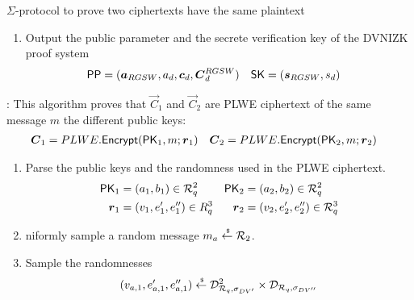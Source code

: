 \begin{section}{$\Sigma$-protocol to prove two ciphertexts have the same plaintext}
\begin{description}
\begin{enumerate}
\begin{enumerate}
        \item Sample polynomials $v,e' \sample \mathcal{D}_{R_q, \sigma_{BV}}$ and $e'' \sample  \mathcal{D}_{R_q, \sigma_{BV}'}$.
        \item Compute the following ciphertexts
          \begin{align*}
            \mat{C}_d^{RGSW} &= \vec{a}_{RGSW} \cdot \mat{R}_{RGSW} + \mat{E}_{RSGW} +  d \cdot \mat{G} &
            \vec{c}_d &= \begin{bmatrix} b_d v + 2e'' + \mu \\ -a_d v + 2e' \end{bmatrix}
          \end{align*}
        \end{enumerate}
        \item Output the public parameter and the secrete verification key of the DVNIZK proof system
        \begin{align*}
          \PPP &= (\vec{a}_{RGSW}, a_d, \vec{c}_d, \vec{C}_d^{RGSW}) & \SK &= (\vec{s}_{RGSW}, s_d)
        \end{align*}
      \end{enumerate}
      \item [$\Prove(\PPP, \vec{C}_1, \vec{C_2}, \vec{r}_1, \vec{r}_2, m, \PK_1, \PK_2)$]:
      This algorithm proves that $\vec{C}_1$ and $\vec{C}_2$ are PLWE ciphertext of the same message $m$
      \wrt the different public keys:
      \begin{align*}
        \vec{C}_1 &= PLWE.\Enc(\PK_1, m; \vec{r}_1) &  \vec{C}_2 &= PLWE.\Enc(\PK_2, m; \vec{r}_2)
      \end{align*}
      \begin{enumerate}
        \item Parse the public keys and the randomness used in the PLWE ciphertext.
        \begin{align*}
          \PK_1 &= (a_1, b_1) \in \R_q^2 & \PK_2 &= (a_2, b_2) \in \R_q^2 \\
          \vec{r}_1 &= (v_1, e_1', e_1'') \in R_q^3 & \vec{r}_2 &= (v_2, e_2', e_2'') \in \R_q^3
        \end{align*}
        \item niformly sample a random message $m_a \stackrel{{\scriptscriptstyle \mkern4mu \$}}{\gets} {\mathcal{R}}_2$.
        \item Sample the randomnesses
        \begin{align*}
          (v_{a,1}, e_{a,1}', e_{a,1}'') &\sample \mathcal{D}^2_{\R_q, \sigma_{DV'}} \times \mathcal{D}_{\R_q, \sigma_{DV''}}\\

\end{align*}
\end{enumerate}
\end{description}
\end{section}
